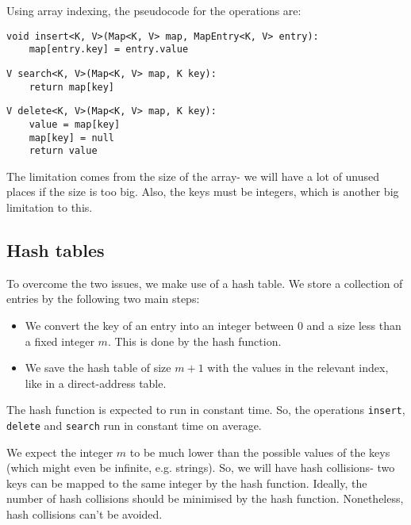\documentclass[a4paper, openany]{memoir}
\begin{document}
\noindent Using array indexing, the pseudocode for the operations are:
\begin{lstlisting}[language=pseudocode]
void insert<K, V>(Map<K, V> map, MapEntry<K, V> entry):
    map[entry.key] = entry.value
\end{lstlisting}
\begin{lstlisting}[language=pseudocode]
V search<K, V>(Map<K, V> map, K key):
    return map[key]
\end{lstlisting}
\begin{lstlisting}[language=pseudocode]
V delete<K, V>(Map<K, V> map, K key):
    value = map[key]
    map[key] = null
    return value
\end{lstlisting}

\noindent The limitation comes from the size of the array- we will have a lot of unused places if the size is too big. Also, the keys must be integers, which is another big limitation to this.

\subsection{Hash tables}
To overcome the two issues, we make use of a hash table. We store a collection of entries by the following two main steps:
\begin{itemize}
    \item We convert the key of an entry into an integer between 0 and a size less than a fixed integer $m$. This is done by the hash function.
    \item We save the hash table of size $m+1$ with the values in the relevant index, like in a direct-address table.
\end{itemize}
The hash function is expected to run in constant time. So, the operations \texttt{insert}, \texttt{delete} and \texttt{search} run in constant time on average.

\noindent We expect the integer $m$ to be much lower than the possible values of the keys (which might even be infinite, e.g. strings). So, we will have hash collisions- two keys can be mapped to the same integer by the hash function. Ideally, the number of hash collisions should be minimised by the hash function. Nonetheless, hash collisions can't be avoided.
\end{document}
